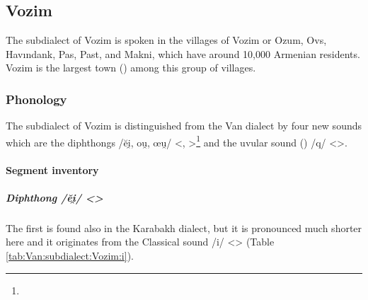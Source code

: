 \subsection{Vozim}


The subdialect of Vozim is spoken in the villages of Vozim or Ozum, Ovs, Havındank, Pas, Past, and Makni, which have around 10,000 Armenian residents. Vozim is the largest town () among this group of villages. 

\subsubsection{Phonology}

The subdialect of Vozim is distinguished from the Van dialect by four new sounds which are the diphthongs /ĕi̯, ou̯, œu̯/ <, >\footnote{} and the uvular sound () /q/ <>. 

\paragraph{Segment inventory}
\subparagraph{Diphthong /ĕi̯/ <>}\label{sec:Van:subdialect:Vozim:seg:diphej}

The first is found also in the Karabakh dialect, but it is pronounced much shorter here and it originates from the Classical sound /i/ <> (Table \ref{tab:Van:subdialect:Vozim:i}). 

\begin{table}[H]
	\centering
	\caption{Change from Classical Armenian /i/ <> to /ĕi̯/ <> in the Vozim subdialect of the Van dialect}
	\label{tab:Van:subdialect:Vozim:i}
\end{table} 

